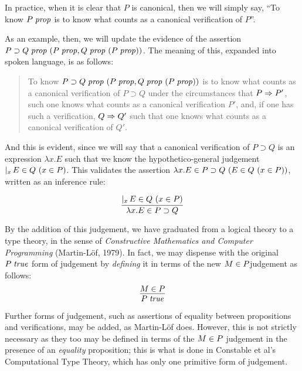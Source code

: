 \documentclass[main.tex]{subfiles}
\begin{document}
In practice, when it is clear that $P$ is canonical, then we will simply say,
``To know $P\;\mathit{prop}$ is to know what counts as a canonical verification of
$P$''.

As an example, then, we will update the evidence of the assertion
$P\supset Q\;\mathit{prop}\ (P\;\mathit{prop},Q\;\mathit{prop}\ (P\;\mathit{prop}))$. The meaning
of this, expanded into spoken language, is as follows:
\begin{quote}
  To know $P\supset Q\;\mathit{prop}\ (P\;\mathit{prop},Q\;\mathit{prop}\ (P\;\mathit{prop}))$ is
  to know what counts as a canonical verification of $P\supset Q$ under
  the circumstances that $P\Rightarrow P'$, such one knows what counts as a
  canonical verification $P'$, and, if one has such a verification,
  $Q\Rightarrow Q'$ such that one knows what counts as a canonical verification of
  $Q'$.
\end{quote}

And this is evident, since we will say that a canonical verification of
$P\supset Q$ is an expression $\lambda x. E$ such that we know the
hypothetico-general judgement $\lvert_{x}\,E\in Q\ (x\in P)$. This
validates the assertion $\lambda x.E\in P\supset
Q\ (E\in Q\ (x\in P))$, written as an inference rule:

%
\[
  \infer{
    \ver{\lambda x.E}{P\supset Q}
  }{
    \genj{x}{\hyp{\ver{E}{Q}}{\ver{x}{P}}}
  }
\]

By the addition of this judgement, we have graduated from a logical theory to a
type theory, in the sense of \emph{Constructive Mathematics and Computer
Programming} (Martin-L\"of, 1979). In fact, we may dispense with the original
$P\;\mathit{true}$ form of judgement by \emph{defining} it in terms of the new
$M\in P $judgement as follows:
\[
  \infer{
    \istrue{P}
  }{
    \ver{M}{P}
  }
\]

Further forms of judgement, such as assertions of equality between propositions
and verifications, may be added, as Martin-L\"of does. However, this is not
strictly necessary as they too may be defined in terms of the $M\in P$
judgement in the presence of an \emph{equality} proposition; this is what is
done in Constable et al's Computational Type Theory, which has only one
primitive form of judgement.
\end{document}
